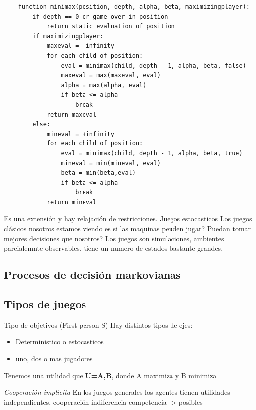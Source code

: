 \begin{lstlisting}
    function minimax(position, depth, alpha, beta, maximizingplayer):
        if depth == 0 or game over in position
            return static evaluation of position
        if maximizingplayer:
            maxeval = -infinity
            for each child of position:
                eval = minimax(child, depth - 1, alpha, beta, false)
                maxeval = max(maxeval, eval)
                alpha = max(alpha, eval)
                if beta <= alpha   
                    break
            return maxeval
        else:
            mineval = +infinity
            for each child of position:
                eval = minimax(child, depth - 1, alpha, beta, true)
                mineval = min(mineval, eval)
                beta = min(beta,eval)
                if beta <= alpha
                    break
            return mineval
\end{lstlisting}






Es una extensión y hay relajación de restricciones. 
Juegos estocasticos
Los juegos clásicos nosotros estamos viendo es si las maquinas peuden jugar? Puedan tomar mejores decisiones que nosotros?
Los juegos son simulaciones, ambientes parcialemnte observables, tiene un numero de estados bastante grandes.


\subsection{Procesos de decisión markovianas}
\subsection{Tipos de juegos}
Tipo de objetivos (First person S)
Hay distintos tipos de ejes:
\begin{itemize}
    \item Deterministico o estocasticos
    \item uno, dos o mas jugadores
\end{itemize}



\begin{definition}
    Tenemos una utilidad que \textbf{U=A,B}, donde A maximiza y B minimiza
\end{definition}

\textit{Cooperación implicita}
En los juegos generales los agentes tienen utilidades independientes, cooperación indiferencia competencia -> posibles

